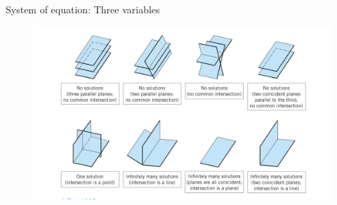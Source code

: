\documentclass[11pt]{beamer}
\theoremstyle{plain}
\begin{document}
\begin{frame}{System of equation: Three variables}
\begin{figure}[H]
\centering
\includegraphics[scale=0.5]{L1 planes.png}
\end{figure}
\end{frame}
\end{document}
